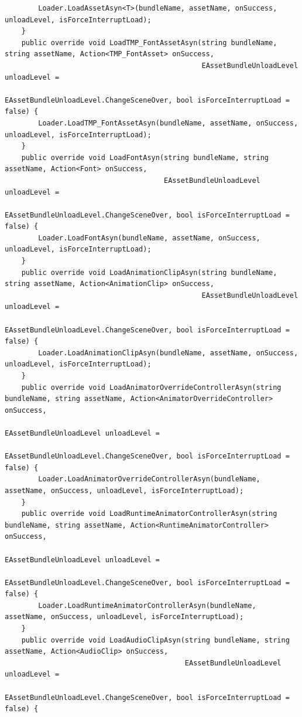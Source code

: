 \documentclass[9pt, b5paper]{article}
\begin{document}
\begin{verbatim}
        Loader.LoadAssetAsyn<T>(bundleName, assetName, onSuccess, unloadLevel, isForceInterruptLoad);
    }
    public override void LoadTMP_FontAssetAsyn(string bundleName, string assetName, Action<TMP_FontAsset> onSuccess, 
                                               EAssetBundleUnloadLevel unloadLevel = 
                                               EAssetBundleUnloadLevel.ChangeSceneOver, bool isForceInterruptLoad = false) {
        Loader.LoadTMP_FontAssetAsyn(bundleName, assetName, onSuccess, unloadLevel, isForceInterruptLoad);
    }
    public override void LoadFontAsyn(string bundleName, string assetName, Action<Font> onSuccess, 
                                      EAssetBundleUnloadLevel unloadLevel = 
                                      EAssetBundleUnloadLevel.ChangeSceneOver, bool isForceInterruptLoad = false) {
        Loader.LoadFontAsyn(bundleName, assetName, onSuccess, unloadLevel, isForceInterruptLoad);
    }
    public override void LoadAnimationClipAsyn(string bundleName, string assetName, Action<AnimationClip> onSuccess, 
                                               EAssetBundleUnloadLevel unloadLevel = 
                                               EAssetBundleUnloadLevel.ChangeSceneOver, bool isForceInterruptLoad = false) {
        Loader.LoadAnimationClipAsyn(bundleName, assetName, onSuccess, unloadLevel, isForceInterruptLoad);
    }
    public override void LoadAnimatorOverrideControllerAsyn(string bundleName, string assetName, Action<AnimatorOverrideController> onSuccess, 
                                                            EAssetBundleUnloadLevel unloadLevel = 
                                                            EAssetBundleUnloadLevel.ChangeSceneOver, bool isForceInterruptLoad = false) {
        Loader.LoadAnimatorOverrideControllerAsyn(bundleName, assetName, onSuccess, unloadLevel, isForceInterruptLoad);
    }
    public override void LoadRuntimeAnimatorControllerAsyn(string bundleName, string assetName, Action<RuntimeAnimatorController> onSuccess, 
                                                           EAssetBundleUnloadLevel unloadLevel = 
                                                           EAssetBundleUnloadLevel.ChangeSceneOver, bool isForceInterruptLoad = false) {
        Loader.LoadRuntimeAnimatorControllerAsyn(bundleName, assetName, onSuccess, unloadLevel, isForceInterruptLoad);
    }
    public override void LoadAudioClipAsyn(string bundleName, string assetName, Action<AudioClip> onSuccess, 
                                           EAssetBundleUnloadLevel unloadLevel = 
                                           EAssetBundleUnloadLevel.ChangeSceneOver, bool isForceInterruptLoad = false) {

\end{verbatim}
\end{document}
